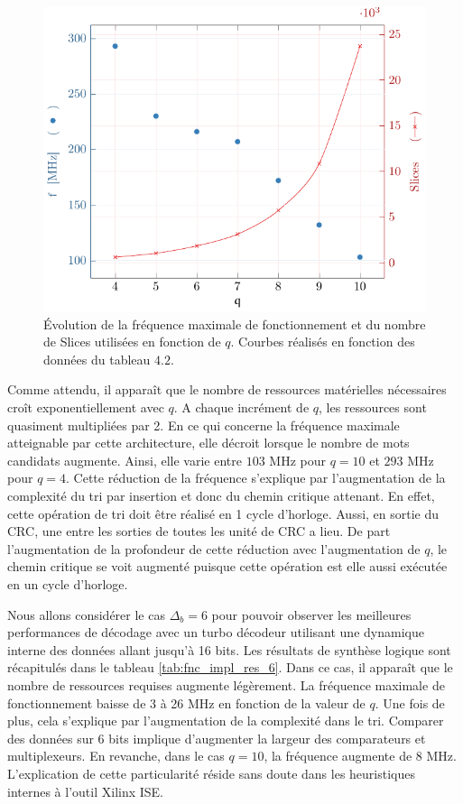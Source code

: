 \begin{figure}[!hbt]
	\centering
	\includegraphics{main/ch4_fig/implem/xc6_4.pdf}
	\caption{Évolution de la fréquence maximale de fonctionnement et du nombre de Slices utilisées en fonction de $q$.
	Courbes réalisés en fonction des données du tableau $4.2$. \label{fig:fnc_impl_res}}
\end{figure}

Comme attendu, il apparaît que le nombre de ressources matérielles nécessaires croît exponentiellement avec $q$. 
A chaque incrément
de $q$, les ressources sont quasiment multipliées par 2. En ce qui concerne la fréquence maximale atteignable par cette 
architecture, elle décroit lorsque le nombre de mots candidats augmente. Ainsi, elle varie entre $103$ MHz pour $q=10$ 
et $293$ MHz pour $q=4$. Cette réduction de la fréquence s'explique par l'augmentation de la complexité du tri par insertion
et donc du chemin critique attenant. En effet, cette opération de tri doit être réalisé en 1 cycle d'horloge. Aussi, en 
sortie du CRC, une  entre les sorties de toutes les unité de CRC a lieu. De part l'augmentation de
la profondeur de cette réduction avec l'augmentation de $q$, le chemin critique se voit augmenté puisque cette opération 
est elle aussi exécutée en un cycle d'horloge.

Nous allons considérer le cas $\Delta_b = 6$ pour pouvoir observer les meilleures performances de décodage avec un turbo décodeur 
utilisant une dynamique interne des données allant jusqu'à 16 bits. Les résultats de synthèse logique sont récapitulés dans le
tableau \ref{tab:fnc_impl_res_6}. Dans ce cas, il apparaît que le nombre de ressources requises augmente légèrement. La 
fréquence maximale de fonctionnement baisse de 3 à 26 MHz en fonction de la valeur de $q$. Une fois de plus, cela 
s'explique par l'augmentation de la complexité dans le tri. Comparer des données sur 6 bits implique d'augmenter la 
largeur des comparateurs et multiplexeurs. En revanche, dans le cas 
$q=10$, la fréquence augmente de 8 MHz. L'explication de cette particularité réside sans doute dans 
les heuristiques internes à l'outil Xilinx ISE. 

